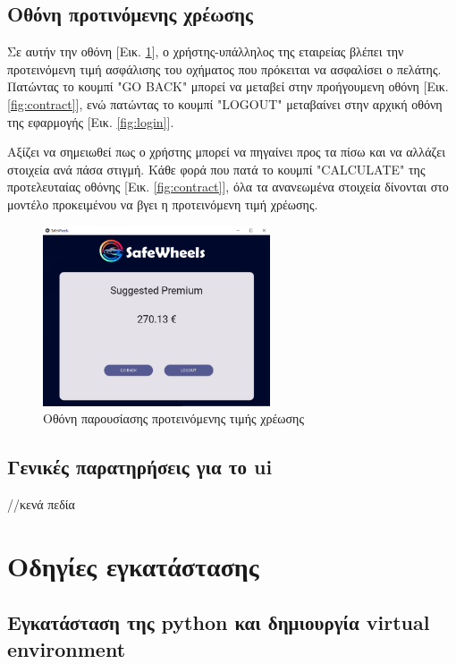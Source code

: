 \documentclass{llncs}
\begin{document}
\newpage
\subsection {Οθόνη προτινόμενης χρέωσης}
Σε αυτήν την οθόνη [Εικ. \ref{fig:premium}], ο χρήστης-υπάλληλος της εταιρείας βλέπει την προτεινόμενη τιμή ασφάλισης του οχήματος που πρόκειται να ασφαλίσει ο πελάτης.
Πατώντας το κουμπί "GO BACK" μπορεί να μεταβεί στην προήγουμενη οθόνη [Εικ. \ref{fig:contract}], ενώ πατώντας το κουμπί "LOGOUT" μεταβαίνει στην αρχική οθόνη της εφαρμογής [Εικ. \ref{fig:login}].

Αξίζει να σημειωθεί πως ο χρήστης μπορεί να πηγαίνει προς τα πίσω και να αλλάζει στοιχεία ανά πάσα στιγμή. Κάθε φορά που πατά το κουμπί "CALCULATE" της προτελευταίας οθόνης [Εικ. \ref{fig:contract}], 
όλα τα ανανεωμένα στοιχεία δίνονται στο μοντέλο προκειμένου να βγει η προτεινόμενη τιμή χρέωσης.

\begin{figure}
    \begin{center}
        \includegraphics[width=0.6\textwidth]{images/suggested_premium.png}
    \end{center}
    \caption{Οθόνη παρουσίασης προτεινόμενης τιμής χρέωσης}  
    \label{fig:premium}  
\end{figure}

\subsection{Γενικές παρατηρήσεις για το ui}
//κενά πεδία



\section{Οδηγίες εγκατάστασης}

\subsection{Εγκατάσταση της python και δημιουργία virtual environment}
\end{document}

